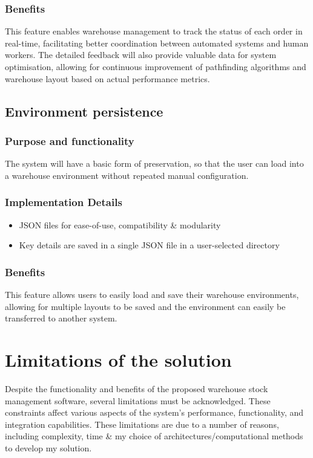 \subsubsection{Benefits}
This feature enables warehouse management to track the status of each order in real-time, facilitating better coordination between automated systems and human workers. The detailed feedback will also provide valuable data for system optimisation, allowing for continuous improvement of pathfinding algorithms and warehouse layout based on actual performance metrics.

\subsection{Environment persistence}
\subsubsection{Purpose and functionality}
The system will have a basic form of preservation, so that the user can load into a warehouse environment without repeated manual configuration.

\subsubsection{Implementation Details}
\begin{itemize}
    \item JSON files for ease-of-use, compatibility \& modularity
    \item Key details are saved in a single JSON file in a user-selected directory
\end{itemize}

\subsubsection{Benefits}
This feature allows users to easily load and save their warehouse environments, allowing for multiple layouts to be saved and the environment can easily be transferred to another system.


\section{Limitations of the solution}

Despite the functionality and benefits of the proposed warehouse stock management software, several limitations must be acknowledged. These constraints affect various aspects of the system's performance, functionality, and integration capabilities. These limitations are due to a number of reasons, including complexity, time \& my choice of architectures/computational methods to develop my solution.

